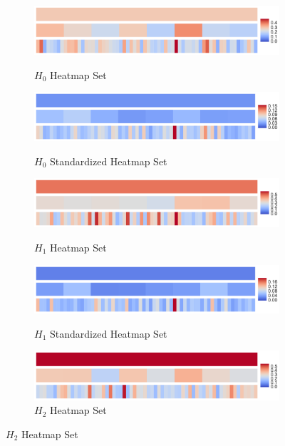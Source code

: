\documentclass[12pt]{article}
\begin{document}
\begin{figure}[htp!]
  \centering
  \begin{subfigure}{.45\textwidth}
    \centering
    \caption{$H_0$ Heatmap Set}
    \includegraphics[width=\linewidth]{fig_12_hmap_dim0_nonorm.pdf}
    \label{fig:cubeHeatmap0}
  \end{subfigure}
  \begin{subfigure}{.45\textwidth}
    \centering
    \caption{$H_0$ Standardized Heatmap Set}
    \includegraphics[width=\linewidth]{fig_12_hmap_dim0_yesnorm.pdf}
    \label{fig:cubeHeatmapStand0}
  \end{subfigure}
  \begin{subfigure}{.45\textwidth}
    \centering
    \caption{$H_1$ Heatmap Set}
    \includegraphics[width=\linewidth]{fig_12_hmap_dim1_nonorm.pdf}
    \label{fig:cubeHeatmap1}
  \end{subfigure}
  \begin{subfigure}{.45\textwidth}
    \centering
    \caption{$H_1$ Standardized Heatmap Set}
    \includegraphics[width=\linewidth]{fig_12_hmap_dim1_yesnorm.pdf}
    \label{fig:cubeHeatmapStand1}
  \end{subfigure}
  \begin{subfigure}{.45\textwidth}
    \centering
    \caption{$H_2$ Heatmap Set}
    \includegraphics[width=\linewidth]{fig_12_hmap_dim2_nonorm.pdf}

\end{subfigure}
\end{figure}
\end{document}
